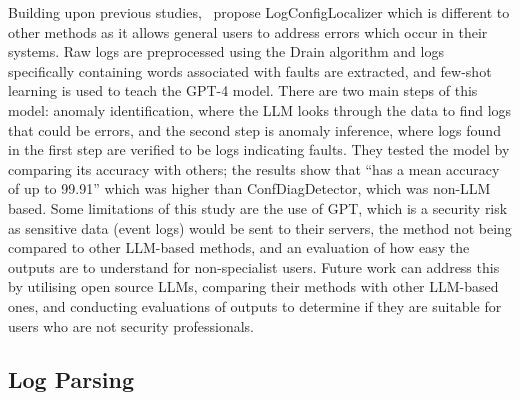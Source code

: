 Building upon previous studies,~\cite{shan2024face} propose LogConfigLocalizer which is different to other methods as it allows general users to address errors which occur in their systems. Raw logs are preprocessed using the Drain algorithm and logs specifically containing words associated with faults are extracted, and few-shot learning is used to teach the GPT-4 model. There are two main steps of this model: anomaly identification, where the LLM looks through the data to find logs that could be errors, and the second step is anomaly inference, where logs found in the first step are verified to be logs indicating faults. They tested the model by comparing its accuracy with others; the results show that ``has a mean accuracy of up to 99.91'' which was higher than ConfDiagDetector, which was non-LLM based. Some limitations of this study are the use of GPT, which is a security risk as sensitive data (event logs) would be sent to their servers, the method not being compared to other LLM-based methods, and an evaluation of how easy the outputs are to understand for non-specialist users. Future work can address this by utilising open source LLMs, comparing their methods with other LLM-based ones, and conducting evaluations of outputs to determine if they are suitable for users who are not security professionals. 

\subsection{Log Parsing}

